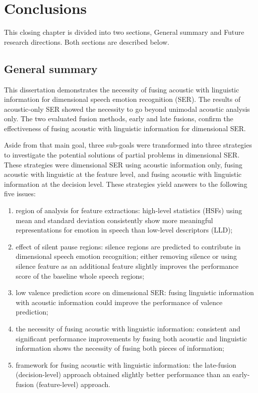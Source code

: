 \chapter{Conclusions}
This closing chapter is divided into two sections, General summary and Future
research directions. Both sections are described below.

\section{General summary}
This dissertation demonstrates the necessity of fusing acoustic with linguistic
information for dimensional speech emotion recognition (SER). The results of
acoustic-only SER showed the necessity to go beyond unimodal acoustic analysis
only. The two evaluated fusion methods, early and late fusions, confirm the
effectiveness of fusing acoustic with linguistic information for dimensional
SER.

Aside from that main goal, three sub-goals were transformed into three
strategies to investigate the potential solutions of partial
problems in dimensional SER. These strategies were dimensional SER using
acoustic information only, fusing acoustic with linguistic at the feature level,
and fusing acoustic with linguistic information at the decision level. These
strategies yield answers to the following five issues:
\begin{enumerate}
\item region of analysis for feature extractions: high-level statistics (HSFs)
using mean and standard deviation consistently show more meaningful
representations for emotion in speech than low-level descriptors (LLD);
\item effect of silent pause regions: silence regions are predicted to
contribute in dimensional speech emotion recognition; either removing silence or
using silence feature as an additional feature slightly improves the
performance score of the baseline whole speech regions;
\item low valence prediction score on dimensional SER: fusing linguistic
information with  acoustic information could improve the performance of valence
prediction;
\item the necessity of fusing acoustic with linguistic information: consistent
and significant performance improvements by fusing both acoustic and linguistic
information shows the necessity of fusing both pieces of information;
\item framework for fusing acoustic with linguistic information: the late-fusion
(decision-level) approach  obtained slightly better performance than an
early-fusion (feature-level) approach. 
\end{enumerate}

